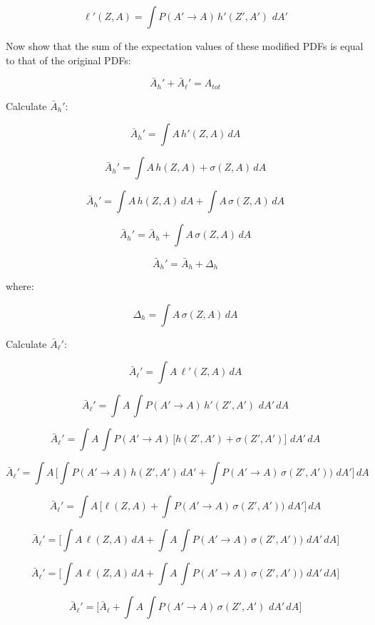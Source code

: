 \documentclass{article}
\begin{document}
\begin{equation}
\ell'(Z,A) =  \int P(A' \rightarrow A)\, h'(Z',A')\,\, dA'
\end{equation}

Now show that the sum of the expectation values of these modified PDFs is equal to that of the original PDFs: 

\begin{equation}
\bar{A}_{h}' + \bar{A}_{\ell}' = A_{tot}
\end{equation}

Calculate $\bar{A}_{h}'$:

\[ \bar{A}_h' = \int A\, h'(Z,A)\, dA \] 

\[ \bar{A}_h' = \int A\, h(Z,A) + \sigma(Z,A) \, dA \] 

\[ \bar{A}_h' = \int A\, h(Z,A)\, dA + \int A\, \sigma(Z,A)\, dA \] 

\[ \bar{A}_h' = \bar{A}_{h} + \int A\, \sigma(Z,A)\, dA \] 

\begin{equation}
\bar{A}_h' = \bar{A}_{h} + \Delta_h
\end{equation}

where:

\begin{equation}
\Delta_h = \int A\, \sigma(Z,A)\, dA
\end{equation}

Calculate $\bar{A}_{\ell}'$:

\[ \bar{A}_{\ell}' = \int A\, \ell'(Z,A)\, dA \]

\[ \bar{A}_{\ell}' = \int A\, \int P(A' \rightarrow A)\, h'(Z',A')\,\, dA'\, dA \]

\[ \bar{A}_{\ell}' = \int A\, \int P(A' \rightarrow A)\, \Big[h(Z',A') + \sigma(Z',A')\Big]\,\, dA'\, dA \]

\[ \bar{A}_{\ell}' = \int A\, \Bigg[ \int P(A' \rightarrow A)\, h(Z',A')\,dA' + \int P(A' \rightarrow A)\, \sigma(Z',A') )\,\, dA'  \Bigg]\, dA \]

\[ \bar{A}_{\ell}' = \int A\, \Bigg[ \ell(Z,A) + \int P(A' \rightarrow A)\, \sigma(Z',A') )\,\, dA'  \Bigg]\, dA \]

\[ \bar{A}_{\ell}' = \Bigg[ \int A\, \ell(Z,A)\,dA + \int A\, \int P(A' \rightarrow A)\, \sigma(Z',A') )\,\, dA'\, dA \Bigg] \]

\[ \bar{A}_{\ell}' = \Bigg[ \int A\, \ell(Z,A)\,dA + \int A\, \int P(A' \rightarrow A)\, \sigma(Z',A') )\,\, dA'\, dA \Bigg] \]

\[ \bar{A}_{\ell}' = \Bigg[ \bar{A}_{\ell} + \int A\, \int P(A' \rightarrow A)\, \sigma(Z',A')\,\, dA'\, dA \Bigg] \]
\end{document}
